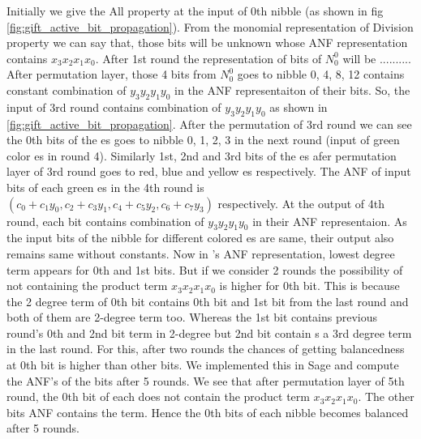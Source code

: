 Initially we give the All property at the input of 0th nibble (as shown in fig \autoref{fig:gift_active_bit_propagation}). From the monomial representation of Division property we can say that, those bits will be unknown whose ANF representation contains $x_3x_2x_1x_0$. After 1st round the representation of bits of $N_0^0$ will be .......... After permutation layer, those 4 bits from $N_0^0$ goes to nibble 0, 4, 8, 12 \sbb contains constant combination of $y_3y_2y_1y_0$ in the ANF representaiton of their bits. So, the input of 3rd round contains combination of $y_3y_2y_1y_0$ as shown in \autoref{fig:gift_active_bit_propagation}. After the permutation of 3rd round we can see the 0th bits of the \sbb es goes to nibble 0, 1, 2, 3 in the next round (input of green color \sbb es in round 4). Similarly 1st, 2nd and 3rd bits of the \sbb es afer permutation layer of 3rd round goes to red, blue and yellow \sbb es respectively. The ANF of input bits of each green \sbb es in the 4th round is $(c_0 + c_1y_0, c_2 + c_3y_1, c_4 + c_5y_2, c_6 + c_7y_3)$ respectively. At the output of 4th round, each bit contains combination of $y_3y_2y_1y_0$ in their ANF representaion. As the input bits of the nibble for different colored \sbb es are same, their output also remains same without constants. Now in \gifts's \sbb ANF representation, lowest degree term appears for 0th and 1st bits. But if we consider 2 rounds the possibility of not containing the product term $x_3x_2x_1x_0$ is higher for 0th bit. This is because the 2 degree term of 0th bit contains 0th bit and 1st bit from the last round and both of them are 2-degree term too. Whereas the 1st bit contains previous round's 0th and 2nd bit term in 2-degree but 2nd bit contain s a 3rd degree term in the last round. For this, after two rounds the chances of getting balancedness at 0th bit is higher than other bits. We implemented this in Sage and compute the ANF's of the bits after 5 rounds. We see that after permutation layer of 5th round, the 0th bit of each \sbb does not contain the product term $x_3x_2x_1x_0$. The other bits ANF contains the term. Hence the 0th bits of each nibble becomes balanced after 5 rounds.



